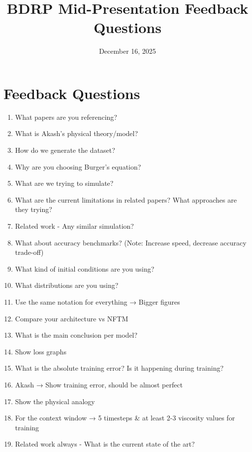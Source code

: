 \documentclass[11pt,a4paper]{article}
\title{BDRP Mid-Presentation Feedback Questions}
\date{December 16, 2025}
\begin{document}
\maketitle

\section*{Feedback Questions}

\begin{enumerate}
    \item What papers are you referencing?
    
    \item What is Akash's physical theory/model?
    
    \item How do we generate the dataset?
    
    \item Why are you choosing Burger's equation?
    
    \item What are we trying to simulate?
    
    \item What are the current limitations in related papers? What approaches are they trying?
    
    \item Related work - Any similar simulation?
    
    \item What about accuracy benchmarks? (Note: Increase speed, decrease accuracy trade-off)
    
    \item What kind of initial conditions are you using?
    
    \item What distributions are you using?
    
    \item Use the same notation for everything → Bigger figures
    
    \item Compare your architecture vs NFTM
    
    \item What is the main conclusion per model?
    
    \item Show loss graphs
    
    \item What is the absolute training error? Is it happening during training?
    
    \item Akash → Show training error, should be almost perfect
    
    \item Show the physical analogy
    
    \item For the context window → 5 timesteps \& at least 2-3 viscosity values for training
    
    \item Related work always - What is the current state of the art?
    
\end{enumerate}
\end{document}
